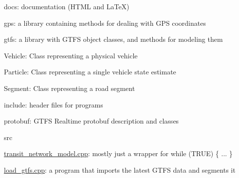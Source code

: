\begin{DoxyItemize}
\item {\ttfamily docs}\+: documentation (H\+T\+ML and La\+TeX)
\item {\ttfamily gps}\+: a library containing methods for dealing with G\+PS coordinates
\item {\ttfamily gtfs}\+: a library with G\+T\+FS object classes, and methods for modeling them
\begin{DoxyItemize}
\item {\ttfamily Vehicle}\+: Class representing a physical vehicle
\item {\ttfamily Particle}\+: Class representing a single vehicle state estimate
\item {\ttfamily Segment}\+: Class representing a road segment
\end{DoxyItemize}
\item {\ttfamily include}\+: header files for programs
\item {\ttfamily protobuf}\+: G\+T\+FS Realtime protobuf description and classes
\item {\ttfamily src}
\begin{DoxyItemize}
\item {\ttfamily \hyperlink{transit__network__model_8cpp}{transit\+\_\+network\+\_\+model.\+cpp}}\+: mostly just a wrapper for {\ttfamily while (T\+R\+UE) \{ ... \}}
\item {\ttfamily \hyperlink{load__gtfs_8cpp}{load\+\_\+gtfs.\+cpp}}\+: a program that imports the latest G\+T\+FS data and segments it 
\end{DoxyItemize}
\end{DoxyItemize}